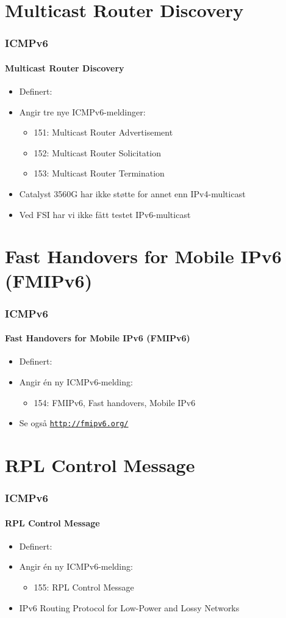 \section{Multicast Router Discovery}
\begin{frame}%
  \frametitle{ICMPv6}
  \framesubtitle{Multicast Router Discovery}
  \begin{itemize}%
  \item Definert: 
  \item Angir tre nye ICMPv6-meldinger:
    \begin{itemize}%
    \item 151: Multicast Router Advertisement
    \item 152: Multicast Router Solicitation
    \item 153: Multicast Router Termination
    \end{itemize}
  \item Catalyst 3560G har ikke støtte for annet enn IPv4-multicast
  \item Ved FSI har vi ikke fått testet IPv6-multicast
  \end{itemize}
\end{frame}

\section{Fast Handovers for Mobile IPv6 (FMIPv6)}
\begin{frame}%
  \frametitle{ICMPv6}
  \framesubtitle{Fast Handovers for Mobile IPv6 (FMIPv6)}
  \begin{itemize}%
  \item Definert: 
  \item Angir én ny ICMPv6-melding:
    \begin{itemize}%
    \item 154: FMIPv6, Fast handovers, Mobile IPv6
    \end{itemize}
  \item Se også \texttt{\url{http://fmipv6.org/}}
  \end{itemize}
\end{frame}

\section{RPL Control Message}
\begin{frame}%
  \frametitle{ICMPv6}
  \framesubtitle{RPL Control Message}
  \begin{itemize}%
  \item Definert: 
  \item Angir én ny ICMPv6-melding:
    \begin{itemize}%
    \item 155: RPL Control Message
    \end{itemize}
  \item IPv6 Routing Protocol for Low-Power and Lossy Networks
  \end{itemize}
\end{frame}

